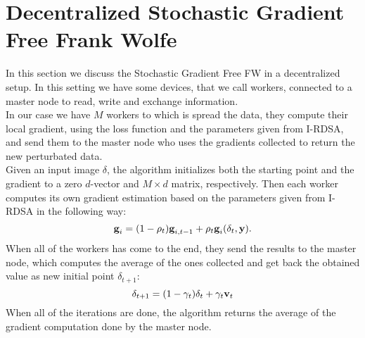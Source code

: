\section{Decentralized Stochastic Gradient Free Frank Wolfe}
In this section we discuss the Stochastic Gradient Free FW in a decentralized setup. In this setting we have some devices, that we call workers, connected to a master node to read, write and exchange information.\\
In our case we have $M$ workers to which is spread the data, they compute their local gradient, using the loss function and the parameters given from I-RDSA, and send them to the master node who uses the gradients collected to return the new perturbated data.\\
Given an input image \boldmath$\delta$, the algorithm initializes both the starting point and the gradient to a zero $d$-vector and $M \times d$ matrix, respectively. Then each worker computes its own gradient estimation based on the parameters given from I-RDSA in the following way:
\[\textbf{g}_i= (1- \rho_t)\textbf{g}_{i,t-1} + \rho_t\textbf{g}_i(\text{\boldmath}\delta_t,\textbf{y}).\]
 When all of the workers has come to the end, they send the results to the master node, which computes the average of the ones collected and get back the obtained value as new initial point \boldmath$\delta_{t+1}$:
\[\text{\boldmath}\delta_{t+1} = (1-\gamma_t)\text{\boldmath}\delta_t + \gamma_t\textbf{v}_t \]
 When all of the iterations are done, the algorithm returns the average of the gradient computation done by the master node.

